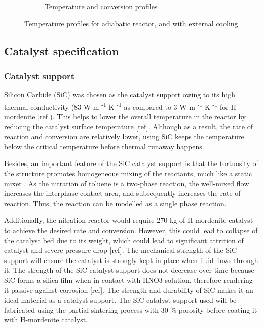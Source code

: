 \begin{figure}[h]
\begin{subfigure}{0.32\linewidth}
        \caption{Temperature and conversion profiles}
    \end{subfigure}

    \caption{Temperature profiles for adiabatic reactor, and with external cooling}
    \label{fig:simple-tube}
\end{figure}

\subsection{Catalyst specification}
\subsubsection{Catalyst support}
Silicon Carbide (SiC) was chosen as the catalyst support owing to its high thermal conductivity (83 W m \textsuperscript{-1} K \textsuperscript{-1} as compared to 3 W m \textsuperscript{-1} K \textsuperscript{-1} for H-mordenite [ref]). This helps to lower the overall temperature in the reactor by reducing the catalyst surface temperature [ref]. Although as a result, the rate of reaction and conversion are relatively lower, using SiC keeps the temperature below the critical temperature before thermal runaway happens. 

Besides, an important feature of the SiC catalyst support is that the tortuosity of the structure promotes homogeneous mixing of the reactants, much like a static mixer \cite{duong-viet_silicon_2016}. As the nitration of toluene is a two-phase reaction, the well-mixed flow increases the interphase contact area, and subsequently increases the rate of reaction. Thus, the reaction can be modelled as a single phase reaction.

Additionally, the nitration reactor would require 270 kg of H-mordenite catalyst to achieve the desired rate and conversion. However, this could lead to collapse of the catalyst bed due to its weight, which could lead to significant attrition of catalyst and severe pressure drop [ref]. The mechanical strength of the SiC support will ensure the catalyst is strongly kept in place when fluid flows through it. The strength of the SiC catalyst support does not decrease over time because SiC forms a silica film when in contact with HNO3 solution, therefore rendering it passive against corrosion [ref]. The strength and durability of SiC makes it an ideal material as a catalyst support. The SiC catalyst support used will be fabricated using the partial sintering process with 30 \% porosity before coating it with H-mordenite catalyst.

